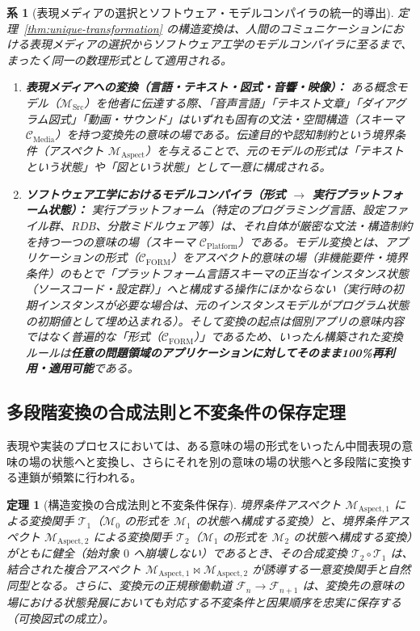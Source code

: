 \documentclass[11pt,a4paper]{ltjsarticle}
\theoremstyle{definition}
\theoremstyle{plain}
\newtheorem{theorem}{定理}[section]
\newtheorem{corollary}{系}[section]
\theoremstyle{remark}
\newcommand{\CFORM}{\mathcal{C}_{\mathrm{FORM}}}
\newcommand{\MSrc}{\mathcal{M}_{\mathrm{Src}}}
\newcommand{\MAspect}{\mathcal{M}_{\mathrm{Aspect}}}
\begin{document}
\begin{corollary}[表現メディアの選択とソフトウェア・モデルコンパイラの統一的導出]\label{cor:media-and-compilers}
定理~\ref{thm:unique-transformation} の構造変換は、人間のコミュニケーションにおける表現メディアの選択からソフトウェア工学のモデルコンパイラに至るまで、まったく同一の数理形式として適用される。
\begin{enumerate}
    \item \textbf{表現メディアへの変換（言語・テキスト・図式・音響・映像）：}
    ある概念モデル（$\MSrc$）を他者に伝達する際、「音声言語」「テキスト文章」「ダイアグラム図式」「動画・サウンド」はいずれも固有の文法・空間構造（スキーマ $\mathcal{C}_{\mathrm{Media}}$）を持つ変換先の意味の場である。伝達目的や認知制約という境界条件（アスペクト $\MAspect$）を与えることで、元のモデルの形式は「テキストという状態」や「図という状態」として一意に構成される。
    \item \textbf{ソフトウェア工学におけるモデルコンパイラ（形式 $\to$ 実行プラットフォーム状態）：}
    実行プラットフォーム（特定のプログラミング言語、設定ファイル群、RDB、分散ミドルウェア等）は、それ自体が厳密な文法・構造制約を持つ一つの意味の場（スキーマ $\mathcal{C}_{\mathrm{Platform}}$）である。モデル変換とは、アプリケーションの形式（$\CFORM$）をアスペクト的意味の場（非機能要件・境界条件）のもとで「プラットフォーム言語スキーマの正当なインスタンス状態（ソースコード・設定群）」へと構成する操作にほかならない（実行時の初期インスタンスが必要な場合は、元のインスタンスモデルがプログラム状態の初期値として埋め込まれる）。そして変換の起点は個別アプリの意味内容ではなく普遍的な「形式（$\CFORM$）」であるため、いったん構築された変換ルールは\textbf{任意の問題領域のアプリケーションに対してそのまま100\%再利用・適用可能}である。
\end{enumerate}
\end{corollary}

\subsection{多段階変換の合成法則と不変条件の保存定理}
表現や実装のプロセスにおいては、ある意味の場の形式をいったん中間表現の意味の場の状態へと変換し、さらにそれを別の意味の場の状態へと多段階に変換する連鎖が頻繁に行われる。

\begin{theorem}[構造変換の合成法則と不変条件保存]\label{thm:transformation-composition}
境界条件アスペクト $\mathcal{M}_{\mathrm{Aspect}, 1}$ による変換関手 $\mathcal{T}_1$（$\mathcal{M}_0$ の形式を $\mathcal{M}_1$ の状態へ構成する変換）と、境界条件アスペクト $\mathcal{M}_{\mathrm{Aspect}, 2}$ による変換関手 $\mathcal{T}_2$（$\mathcal{M}_1$ の形式を $\mathcal{M}_2$ の状態へ構成する変換）がともに健全（始対象 $0$ へ崩壊しない）であるとき、その合成変換 $\mathcal{T}_2 \circ \mathcal{T}_1$ は、結合された複合アスペクト $\mathcal{M}_{\mathrm{Aspect}, 1} \bowtie \mathcal{M}_{\mathrm{Aspect}, 2}$ が誘導する一意変換関手と自然同型となる。さらに、変換元の正規稼働軌道 $\mathcal{F}_n \to \mathcal{F}_{n+1}$ は、変換先の意味の場における状態発展においても対応する不変条件と因果順序を忠実に保存する（可換図式の成立）。
\end{theorem}
\end{document}
